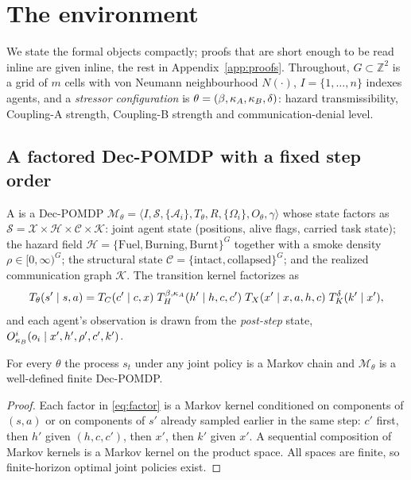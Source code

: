 \section{The environment}
\label{sec:env}

We state the formal objects compactly; proofs that are short enough to be
read inline are given inline, the rest in Appendix~\ref{app:proofs}.
Throughout, $G \subset \mathbb{Z}^2$ is a grid of $m$ cells with von Neumann
neighbourhood $N(\cdot)$, $I = \{1,\dots,n\}$ indexes agents, and a
\emph{stressor configuration} is $\theta = (\beta, \kappa_A, \kappa_B, \delta)$:
hazard transmissibility, Coupling-A strength, Coupling-B strength and
communication-denial level.

\subsection{A factored Dec-POMDP with a fixed step order}

\begin{definition}
\label{def:che}
A \CHE{} is a Dec-POMDP $\mathcal{M}_\theta = \langle I, \mathcal{S},
\{\mathcal{A}_i\}, T_\theta, R, \{\Omega_i\}, O_\theta, \gamma\rangle$ whose
state factors as $\mathcal{S} = \mathcal{X} \times \mathcal{H} \times
\mathcal{C} \times \mathcal{K}$: joint agent state (positions, alive flags,
carried task state); the hazard field $\mathcal{H} = \{\mathrm{Fuel},
\mathrm{Burning}, \mathrm{Burnt}\}^{G}$ together with a smoke density
$\rho \in [0,\infty)^G$; the structural state $\mathcal{C} =
\{\mathrm{intact}, \mathrm{collapsed}\}^{G}$; and the realized communication
graph $\mathcal{K}$. The transition kernel factorizes as
\begin{equation}
  T_\theta(s' \mid s, a) = T_C(c' \mid c, x)\;
  T_H^{\beta,\kappa_A}(h' \mid h, c, c')\;
  T_X(x' \mid x, a, h, c)\;
  T_K^{\delta}(k' \mid x'),
  \label{eq:factor}
\end{equation}
and each agent's observation is drawn from the \emph{post-step} state,
$O^i_{\kappa_B}(o_i \mid x', h', \rho', c', k')$.
\end{definition}

\begin{proposition}
\label{prop:markov}
For every $\theta$ the process $s_t$ under any joint policy is a Markov chain
and $\mathcal{M}_\theta$ is a well-defined finite Dec-POMDP.
\end{proposition}
\begin{proof}
Each factor in \eqref{eq:factor} is a Markov kernel conditioned on components
of $(s,a)$ or on components of $s'$ already sampled earlier in the same step:
$c'$ first, then $h'$ given $(h, c, c')$, then $x'$, then $k'$ given $x'$. A
sequential composition of Markov kernels is a Markov kernel on the product
space. All spaces are finite, so finite-horizon optimal joint policies exist.
\end{proof}

